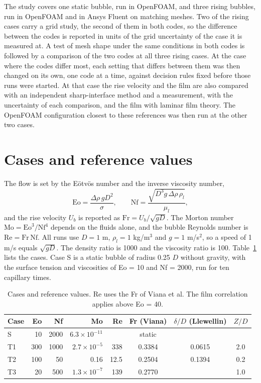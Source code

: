 \documentclass[11pt,a4paper]{article}
\begin{document}
The study covers one static bubble, run in OpenFOAM, and three rising bubbles, run in OpenFOAM and in Ansys Fluent on matching meshes. Two of the rising cases carry a grid study, the second of them in both codes, so the difference between the codes is reported in units of the grid uncertainty of the case it is measured at. A test of mesh shape under the same conditions in both codes is followed by a comparison of the two codes at all three rising cases. At the case where the codes differ most, each setting that differs between them was then changed on its own, one code at a time, against decision rules fixed before those runs were started. At that case the rise velocity and the film are also compared with an independent sharp-interface method and a measurement, with the uncertainty of each comparison, and the film with laminar film theory. The OpenFOAM configuration closest to these references was then run at the other two cases.

\section{Cases and reference values}

The flow is set by the E\"otv\"os number and the inverse viscosity number,
\begin{equation}
\mathrm{Eo} = \frac{\Delta\rho\, g D^2}{\sigma}, \qquad
\mathrm{Nf} = \frac{\sqrt{D^3 g\, \Delta\rho\, \rho_l}}{\mu_l},
\end{equation}
and the rise velocity $U_b$ is reported as $\mathrm{Fr} = U_b/\sqrt{gD}$. The Morton number $\mathrm{Mo} = \mathrm{Eo}^3/\mathrm{Nf}^4$ depends on the fluids alone, and the bubble Reynolds number is $\mathrm{Re} = \mathrm{Fr}\,\mathrm{Nf}$. All runs use $D = 1$ m, $\rho_l = 1$ kg/m$^3$ and $g = 1$ m/s$^2$, so a speed of 1 m/s equals $\sqrt{gD}$. The density ratio is 1000 and the viscosity ratio is 100. Table~\ref{tab:cases} lists the cases. Case S is a static bubble of radius 0.25 $D$ without gravity, with the surface tension and viscosities of Eo = 10 and Nf = 2000, run for ten capillary times.

\begin{table}[H]
\centering
\caption{Cases and reference values. Re uses the Fr of Viana et al. The film correlation applies above Eo = 40.}
\label{tab:cases}
\begin{tabular}{lrrrrccc}
\toprule
Case & Eo & Nf & Mo & Re & Fr (Viana) & $\delta/D$ (Llewellin) & $Z/D$ \\
\midrule
S & 10 & 2000 & $6.3\times10^{-11}$ & & static & & \\
T1 & 300 & 1000 & $2.7\times10^{-5}$ & 338 & 0.3384 & 0.0615 & 2.0 \\
T2 & 100 & 50 & 0.16 & 12.5 & 0.2504 & 0.1394 & 0.2 \\
T3 & 20 & 500 & $1.3\times10^{-7}$ & 139 & 0.2770 & & 1.0 \\
\bottomrule
\end{tabular}
\end{table}
\end{document}
